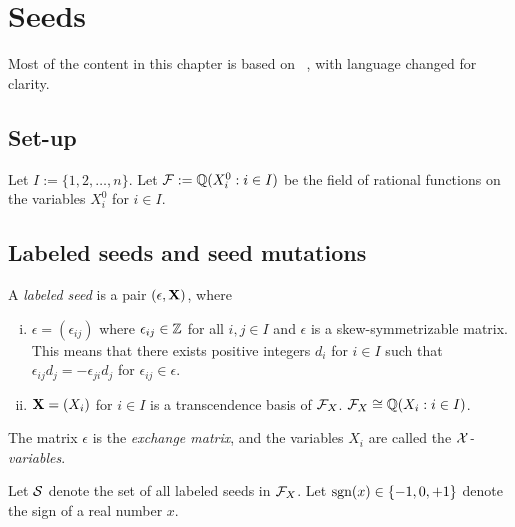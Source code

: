 \chapter{Seeds} \label{ch:seeds}

Most of the content in this chapter is based on ~\cite{aik023earthquake}, with language changed for clarity.

\section{Set-up} \label{sec:setup}

Let $I := \{1,2,\ldots,n\}$. Let $\mathbf{\mathcal{F}} := \mathbb{Q}(X^0_i:i\in I)$ be the field of rational functions on the variables $X^0_i$ for $i \in I$.

\section{Labeled seeds and seed mutations} \label{seeds}
\begin{definition}\label{def:labeledseed}
    A \textit{labeled seed} is a pair $(\epsilon, \mathbf{X})$, where
    \begin{enumerate}[i.]
        \item
            $\epsilon=(\epsilon_{ij})$ where $\epsilon_{ij} \in \mathbb{Z}$ for all $i,j \in I$  and $\epsilon$ is a skew-symmetrizable matrix.
            This means that there exists positive integers $d_i$ for $i \in I$ such that $\epsilon_{ij}d_j = -\epsilon_{ji}d_j$ for $\epsilon_{ij} \in \epsilon$.
        \item
            $\mathbf{X} = (X_i)$ for $i \in I$ is a transcendence basis of $\mathcal{F}_X$. $\mathcal{F}_X \cong \mathbb{Q}(X_i:i\in I)$.
    \end{enumerate}

    The matrix $\epsilon$ is the \textit{exchange matrix}, and the variables $X_i$ are called the \textit{$\mathbf{\mathcal{X}}$-variables}.
\end{definition}

Let $\mathcal{S}$ denote the set of all labeled seeds in $\mathcal{F}_X$. Let $\text{sgn}(x) \in \{-1, 0, +1\}$  denote the sign of a real number $x$.

